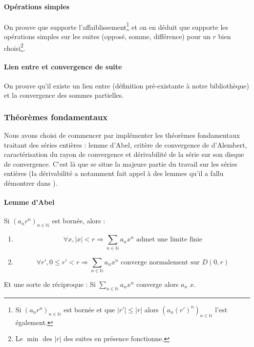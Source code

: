 \paragraph{Opérations simples} On prouve que  supporte l'affaiblissement\footnote{Si $\left(a_n r^n\right)_{n\in \mathbb{N}}$ est bornée et que $|r'| \le |r|$ alors $\left(a_n (r')^n\right)_{n\in \mathbb{N}}$ l'est également.} et on en déduit que  supporte les opérations simples sur les suites (opposé, somme, différence) pour un $r$ bien choisi\footnote{Le $\min$ des $|r|$ des suites en présence fonctionne.}.

\paragraph{Lien entre  et convergence de suite} On prouve qu'il existe un lien entre  (définition pré-existante à notre bibliothèque) et la convergence des sommes partielles.

\subsubsection{Théorèmes fondamentaux}

Nous avons choisi de commencer par implémenter les théorèmes fondamentaux traitant des séries entières : lemme d'Abel, critère de convergence de d'Alembert, caractérisation du rayon de convergence et dérivabilité de la série sur son disque de convergence. C'est là que se situe la majeure partie du travail sur les séries entières (la dérivabilité a notamment fait appel à des lemmes qu'il a fallu démontrer dans ).

\paragraph{Lemme d'Abel} Si $\left(a_n r^n\right)_{n\in \mathbb{N}}$ est bornée, alors :
\begin{enumerate}
 \item $$\forall x, |x| < r \Rightarrow \sum_{n\in \mathbb{N}} a_n x^n \text{ admet une limite finie}$$
 \item $$\forall r', 0 \le r' < r \Rightarrow \sum_{n\in \mathbb{N}} a_n x^n \text{ converge normalement sur } D\left(0,r\right)$$
\end{enumerate}

Et une sorte de réciproque : Si $\sum_{n\in \mathbb{N}} a_n x^n$ converge alors  $a_n$ $x$.

